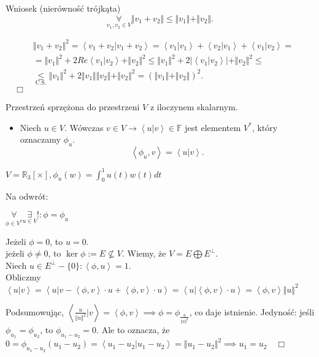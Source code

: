 \documentclass[../main.tex]{subfiles}
\begin{document}
         Wniosek (nierówność trójkąta)\\
         \[
         \underset{v_1,v_2\in V}{\forall} \Vert v_1+v_2 \Vert \le \Vert v_1 \Vert + \Vert v_2 \Vert
         .\]
         \begin{dowod}
             \begin{align*}
             &\Vert v_1+v_2 \Vert ^2 = \left< v_1+v_2 | v_1+v_2 \right> = \left<v_1|v_1 \right> + \left<v_2|v_1 \right> + \left<v_1|v_2 \right> =\\
             &= \Vert v_1 \Vert ^2 + 2 Re \left<v_1|v_2 \right> + \Vert v_2 \Vert ^2 \le \Vert v_1 \Vert ^2 + 2 \left| \left<v_1|v_2 \right> \right| +\Vert v_2 \Vert ^2 \le \\
             & \underset{\text{C.S.}}{\le} \Vert v_1 \Vert ^2 + 2 \Vert v_1 \Vert \Vert v_2 \Vert + \Vert v_2 \Vert ^2 = \left( \Vert v_1 \Vert +\Vert v_2 \Vert  \right) ^2
             .\end{align*}
             $\quad\Box$
         \end{dowod}

        Przestrzeń sprzężona do przestrzeni $V$ z iloczynem skalarnym.\\
        \begin{itemize}
            \item Niech $u\in V$. Wówczas $v\in V \to \left<u|v \right>\in \mathbb{F}$ jest elementem $V^*$, który oznaczamy  $\phi_u$.
                \[
                \left<\phi_u,v \right> = \left<u|v \right>
                .\]
        \end{itemize}
                \begin{przyklad}
                    $V = \mathbb{R}_3[\times], \phi_u(w) = \int_0^1 u(t)w(t)dt$
                \end{przyklad}
                Na odwrót:
                \begin{tw}
                    $\underset{\phi\in V^*}{\forall} \underset{u\in V}{\exists}! : \phi = \phi_u$
                \end{tw}
                \begin{dowod}
                    Jeżeli $\phi = 0$, to $u = 0$.\\
                    jeżeli $\phi \neq 0$, to $\ker \phi := E \not\subseteq V$. Wiemy, że $V = E \bigoplus E^\perp$.\\
                    Niech $u\in E^\perp - \{0\}: \left<\phi,u \right> = 1$.\\
                    Obliczmy $\left<u|v \right> = \left< u | v - \left< \phi,v \right>\cdot u + \left<\phi,v \right>\cdot u \right> = \left<u|\left<\phi,v \right>\cdot u \right> = \left<\phi,v \right>\Vert u \Vert ^2$
                \end{dowod}
                Podsumowując, $\left<\frac{u}{\Vert u \Vert ^2}|v \right> = \left<\phi,v \right> \implies \phi = \phi_{\frac{u}{\Vert u \Vert ^2}}$, co daje istnienie. Jedyność: jeśli $\phi_{u_1} = \phi_{u_2}$, to $\phi_{u_1-u_2} = 0$. Ale to oznacza, że $0 = \phi_{u_1-u_2}(u_1-u_2) = \left<u_1-u_2|u_1-u_2 \right> = \Vert u_1-u_2 \Vert ^2 \implies u_1=u_2 \quad\Box$
\end{document}
